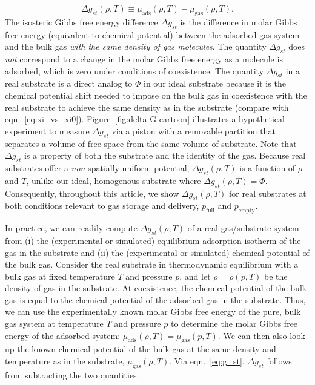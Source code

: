 \documentclass[twoside,twocolumn,9pt]{article}
\newcommand\V{\Phi}
\newcommand\pfull{\ensuremath{p_{\text{full}}}}
\newcommand\pempty{\ensuremath{p_{\text{empty}}}}
\newcommand\gst{\ensuremath{\Delta g_{st}}}
\begin{document}
\begin{equation}
   \gst(\rho, T) \equiv
    \mu_{\text{ads}}(\rho, T) - \mu_{\text{gas}}(\rho, T).
  \label{eq:g_st}
\end{equation}
The isosteric Gibbs free energy difference $\gst$ is the difference in molar
Gibbs free energy (equivalent to chemical potential) between the adsorbed gas system and
the bulk gas \emph{with the same density of gas molecules}. The quantity $\gst$
does \emph{not} correspond to a change in the molar Gibbs free energy as a
molecule is adsorbed, which is zero under conditions of coexistence. The
quantity $\gst$ in a real substrate is a direct analog to $\V$ in our ideal
substrate because it is the chemical potential shift needed to impose on the
bulk gas in coexistence with the real substrate to achieve the same density as
in the substrate (compare with eqn.~\ref{eq:xi_vs_xi0}).
Figure~\ref{fig:delta-G-cartoon} illustrates a hypothetical experiment to
measure $\gst$ via a piston with a removable partition that separates a volume
of free space from the same volume of substrate. Note that $\gst$ is a property
of both the substrate and the identity of the gas. Because real substrates
offer a \emph{non}-spatially uniform potential, $\gst(\rho, T)$ is a function
of $\rho$ and $T$, unlike our ideal, homogenous substrate where $\gst(\rho,
T)=\V$. Consequently, throughout this article, we show $\gst(\rho, T)$ for real
substrates at both conditions relevant to gas storage and delivery, $\pfull$
and $\pempty$.

In practice, we can readily compute $\gst(\rho, T)$ of a real gas/substrate
system from (i) the (experimental or simulated) equilibrium adsorption isotherm
of the gas in the substrate and (ii) the (experimental or simulated) chemical
potential of the bulk gas. Consider the real substrate in thermodynamic
equilibrium with a bulk gas at fixed temperature $T$ and pressure $p$, and let
$\rho=\rho(p, T)$ be the density of gas in the substrate. At coexistence, the
chemical potential of the bulk gas is equal to the chemical potential of the
adsorbed gas in the substrate. Thus, we can use the experimentally known molar
Gibbs free energy of the pure, bulk gas system at temperature $T$ and pressure
$p$ to determine the molar Gibbs free energy of the adsorbed system:
$\mu_{\text{ads}}(\rho, T)=\mu_{\text{gas}}(p, T)$. We can then also look up
the known chemical potential of the bulk gas at the same density and
temperature as in the substrate, $\mu_{\text{gas}}(\rho, T)$. Via
eqn.~\ref{eq:g_st}, $\gst$ follows from subtracting the two quantities.
\end{document}

